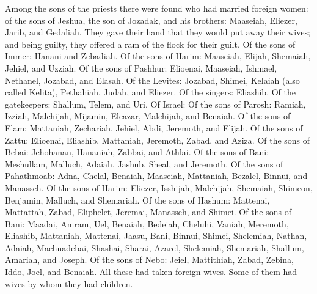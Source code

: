 \begin{paracol}{2}
\begin{otherlanguage}{english}
 Among the sons of the priests there were found who had
married foreign women: of the sons of Jeshua, the son of Jozadak, and
his brothers: Maaseiah, Eliezer, Jarib, and Gedaliah. 
They gave their hand that they would put away their wives; and being
guilty, they offered a ram of the flock for their guilt. 
Of the sons of Immer: Hanani and Zebadiah.  Of the sons
of Harim: Maaseiah, Elijah, Shemaiah, Jehiel, and Uzziah.
 Of the sons of Pashhur: Elioenai, Maaseiah, Ishmael,
Nethanel, Jozabad, and Elasah.  Of the Levites: Jozabad,
Shimei, Kelaiah (also called Kelita), Pethahiah, Judah, and Eliezer.
 Of the singers: Eliashib. Of the gatekeepers: Shallum,
Telem, and Uri.  Of Israel: Of the sons of Parosh:
Ramiah, Izziah, Malchijah, Mijamin, Eleazar, Malchijah, and Benaiah.
 Of the sons of Elam: Mattaniah, Zechariah, Jehiel, Abdi,
Jeremoth, and Elijah.  Of the sons of Zattu: Elioenai,
Eliashib, Mattaniah, Jeremoth, Zabad, and Aziza.  Of the
sons of Bebai: Jehohanan, Hananiah, Zabbai, and Athlai. 
Of the sons of Bani: Meshullam, Malluch, Adaiah, Jashub, Sheal, and
Jeremoth.  Of the sons of Pahathmoab: Adna, Chelal,
Benaiah, Maaseiah, Mattaniah, Bezalel, Binnui, and Manasseh.
 Of the sons of Harim: Eliezer, Isshijah, Malchijah,
Shemaiah, Shimeon,  Benjamin, Malluch, and Shemariah.
 Of the sons of Hashum: Mattenai, Mattattah, Zabad,
Eliphelet, Jeremai, Manasseh, and Shimei.  Of the sons of
Bani: Maadai, Amram, Uel,  Benaiah, Bedeiah, Cheluhi,
 Vaniah, Meremoth, Eliashib,  Mattaniah,
Mattenai, Jaasu,  Bani, Binnui, Shimei, 
Shelemiah, Nathan, Adaiah,  Machnadebai, Shashai, Sharai,
 Azarel, Shelemiah, Shemariah,  Shallum,
Amariah, and Joseph.  Of the sons of Nebo: Jeiel,
Mattithiah, Zabad, Zebina, Iddo, Joel, and Benaiah.  All
these had taken foreign wives. Some of them had wives by whom they had
children. \end{otherlanguage} \end{paracol}
